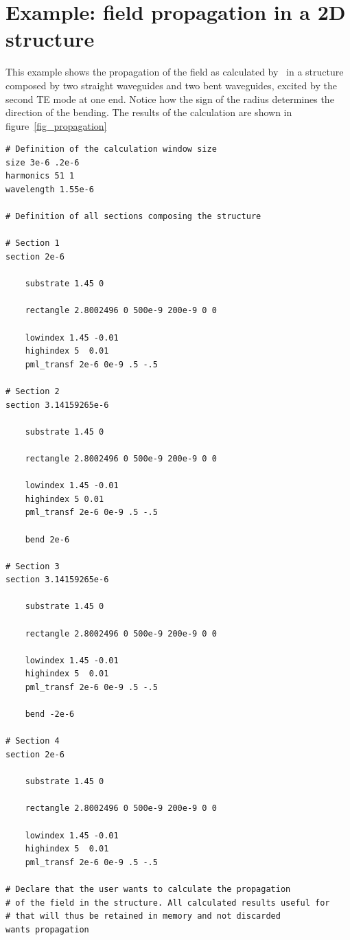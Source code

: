 \section[Propagation in a 2D structure]{Example: field propagation in a 2D structure}
\label{sec_propag_example}
This example shows the propagation of the field as calculated by \afmm\ in a structure composed by two straight waveguides and two bent waveguides, excited by the second TE mode at one end. Notice how the sign of the radius determines the direction of the bending. The results of the calculation are shown in figure~\ref{fig_propagation}
\begin{lstlisting}
# Definition of the calculation window size
size 3e-6 .2e-6
harmonics 51 1
wavelength 1.55e-6

# Definition of all sections composing the structure

# Section 1
section 2e-6

    substrate 1.45 0

    rectangle 2.8002496 0 500e-9 200e-9 0 0

    lowindex 1.45 -0.01
    highindex 5  0.01
    pml_transf 2e-6 0e-9 .5 -.5

# Section 2 
section 3.14159265e-6

    substrate 1.45 0

    rectangle 2.8002496 0 500e-9 200e-9 0 0

    lowindex 1.45 -0.01
    highindex 5 0.01
    pml_transf 2e-6 0e-9 .5 -.5

    bend 2e-6
    
# Section 3
section 3.14159265e-6

    substrate 1.45 0

    rectangle 2.8002496 0 500e-9 200e-9 0 0

    lowindex 1.45 -0.01
    highindex 5  0.01
    pml_transf 2e-6 0e-9 .5 -.5

    bend -2e-6

# Section 4
section 2e-6

    substrate 1.45 0

    rectangle 2.8002496 0 500e-9 200e-9 0 0

    lowindex 1.45 -0.01
    highindex 5  0.01
    pml_transf 2e-6 0e-9 .5 -.5

# Declare that the user wants to calculate the propagation 
# of the field in the structure. All calculated results useful for
# that will thus be retained in memory and not discarded
wants propagation


\end{lstlisting}
